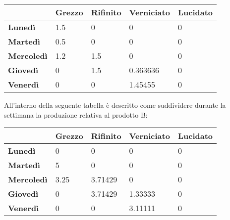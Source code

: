 \documentclass[12pt]{article}
\begin{document}
\begin{table}[H]
	\centering
	\setlength{\tabcolsep}{15pt} %
	\renewcommand{\arraystretch}{2} %
	\begin{center}
		\begin{tabular}{|l|l|l|l|l|}
			\hline
			& \textbf{Grezzo} & \textbf{Rifinito} & \textbf{Verniciato} & \textbf{Lucidato} \\ \hline
			\textbf{Lunedì}    & 1.5               & 0                 & 0                   & 0                 \\ \hline
			\textbf{Martedì}   & 0.5               & 0              	 & 0                   & 0                 \\ \hline
			\textbf{Mercoledì} & 1.2             & 1.5                 & 0             & 0                 \\ \hline
			\textbf{Giovedì}   & 0               & 1.5              & 0.363636                   & 0                 \\ \hline
			\textbf{Venerdì}   & 0               & 0                 & 1.45455               & 0                 \\ \hline
		\end{tabular}
	\end{center}
\end{table}

All'interno della seguente tabella è descritto come suddividere durante la settimana la produzione relativa al prodotto B:
\begin{table}[H]
	\centering
	\setlength{\tabcolsep}{15pt} %
	\renewcommand{\arraystretch}{2} %
	\begin{center}
		\begin{tabular}{|l|l|l|l|l|}
			\hline
			& \textbf{Grezzo} & \textbf{Rifinito} & \textbf{Verniciato} & \textbf{Lucidato} \\ \hline
			\textbf{Lunedì}    & 0              & 0                 & 0                   & 0                 \\ \hline
			\textbf{Martedì}   & 5               & 0              & 0                   & 0                 \\ \hline
			\textbf{Mercoledì} & 3.25             & 3.71429                 & 0             & 0                 \\ \hline
			\textbf{Giovedì}   & 0               & 3.71429              & 1.33333                   & 0                 \\ \hline
			\textbf{Venerdì}   & 0               & 0                 & 3.11111               & 0                 \\ \hline
		\end{tabular}
	\end{center}
\end{table}
\end{document}
